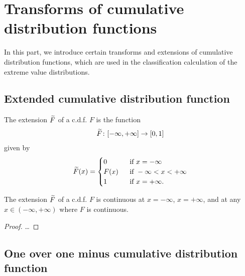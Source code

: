 \chapter{Transforms of cumulative distribution functions}

In this part, we introduce certain transforms and extensions of
cumulative distribution functions, which are used in the classification
calculation of the extreme value distributions.


\section{Extended cumulative distribution function}

\begin{definition}
  \label{def:cdf-extend}
  \leanok
  The extension $\widetilde{F}$ of a c.d.f. $F$ is the function
  \begin{align*}
    \widetilde{F} \colon [-\infty,+\infty] \to [0,1]
  \end{align*}
  given by
  \begin{align*}
    \widetilde{F}(x) = \begin{cases}
      0 & \; \text{ if } x = -\infty \\
      F(x) & \; \text{ if } -\infty < x < +\infty \\
      1 & \; \text{ if } x = +\infty .
      \end{cases}
  \end{align*}
\end{definition}

\begin{lemma}
  \label{lem:cdf-extend-continuity-pts}
  \leanok
  The extension $\widetilde{F}$ of a c.d.f. $F$ is continuous
  at $x = -\infty$, $x = + \infty$, and at any
  $x \in (-\infty,+\infty)$ where $F$ is continuous.
\end{lemma}
\begin{proof}
  \ldots
\end{proof}

\section{One over one minus cumulative distribution function}

